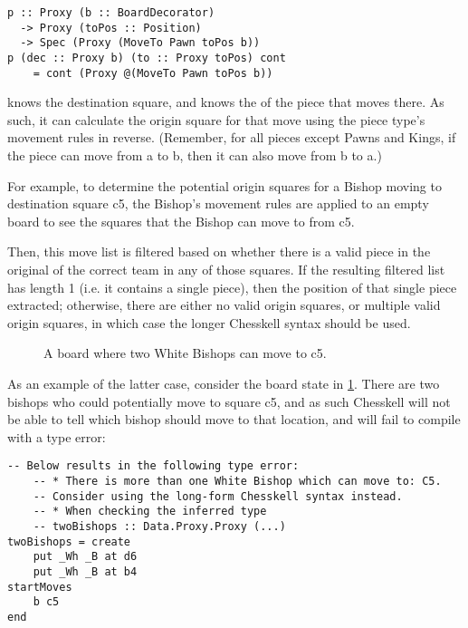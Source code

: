 \begin{lstlisting}
p :: Proxy (b :: BoardDecorator)
  -> Proxy (toPos :: Position)
  -> Spec (Proxy (MoveTo Pawn toPos b))
p (dec :: Proxy b) (to :: Proxy toPos) cont
    = cont (Proxy @(MoveTo Pawn toPos b))
\end{lstlisting}

 knows the destination square, and knows the  of the piece that moves there. As such, it can calculate the origin square for that move using the piece type's movement rules in reverse. (Remember, for all pieces except Pawns and Kings, if the piece can move from a to b, then it can also move from b to a.)

For example, to determine the potential origin squares for a Bishop moving to destination square c5, the Bishop's movement rules are applied to an empty board to see the squares that the Bishop can move to from c5.


Then, this move list is filtered based on whether there is a valid piece in the original  of the correct team in any of those squares. If the resulting filtered list has length 1 (i.e. it contains a single piece), then the position of that single piece extracted; otherwise, there are either no valid origin squares, or multiple valid origin squares, in which case the longer Chesskell syntax should be used.

\begin{figure}
    \centering
    \showboard
    \caption{A board where two White Bishops can move to c5.}
    \label{twobishops}
\end{figure}

As an example of the latter case, consider the board state in \cref{twobishops}. There are two bishops who could potentially move to square c5, and as such Chesskell will not be able to tell which bishop should move to that location, and will fail to compile with a type error:

\begin{lstlisting}
-- Below results in the following type error:
    -- * There is more than one White Bishop which can move to: C5.
    -- Consider using the long-form Chesskell syntax instead.
    -- * When checking the inferred type
    -- twoBishops :: Data.Proxy.Proxy (...)
twoBishops = create
    put _Wh _B at d6
    put _Wh _B at b4
startMoves
    b c5
end
\end{lstlisting}

